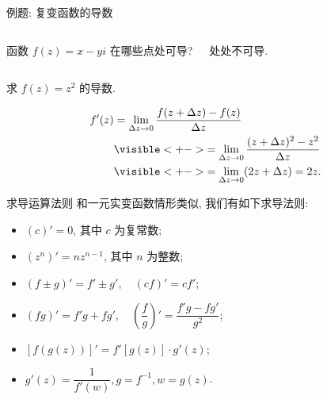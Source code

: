 \begin{frame}[<*>]{例题: 复变函数的导数}
	\onslide<+->
	\begin{columns}
		\begin{exercise}
			函数 $f(z)=x-yi$ 在哪些点处可导? 
		\end{exercise}\onslide<+->
		\begin{answer}
			处处不可导.
		\end{answer}
	\end{columns}

	\onslide<+->
	\begin{example}
		求 $f(z)=z^2$ 的导数.
	\end{example}

	\onslide<+->
	\begin{solution}
		\begin{align*}
		f'(z)&=\lim_{\Delta z\to 0}\frac{f(z+\Delta z)-f(z)}{\Delta z}\\
		&\visible<+->{=\lim_{\Delta z\to 0}\frac{(z+\Delta z)^2-z^2}{\Delta z}}\\
		&\visible<+->{=\lim_{\Delta z\to 0}(2z+\Delta z)=2z.}
		\end{align*}
	\end{solution}
\end{frame}


\begin{frame}{求导运算法则}
	\onslide<+->
	和一元实变函数情形类似, 我们有如下求导法则:
	\begin{theorem}
		\begin{itemize}
			\item $(c)'=0$, 其中 $c$ 为复常数;
			\item $(z^n)'=nz^{n-1}$, 其中 $n$ 为整数;
			\item $(f\pm g)'=f'\pm g',\quad (cf)'=cf'$;
			\item $(fg)'=f'g+fg',\quad \left(\dfrac fg\right)'=\dfrac{f'g-fg'}{g^2}$;
			\item $[f(g(z))]'=f'[g(z)]\cdot g'(z)$;
			\item $g'(z)=\dfrac1{f'(w)}, g=f^{-1}, w=g(z)$.
		\end{itemize}
	\end{theorem}
\end{frame}


